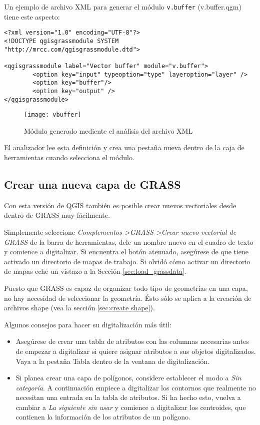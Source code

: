 Un ejemplo de archivo XML para generar el módulo \texttt{v.buffer} (v.buffer.qgm) tiene este aspecto:
\begin{verbatim}
<?xml version="1.0" encoding="UTF-8"?>
<!DOCTYPE qgisgrassmodule SYSTEM "http://mrcc.com/qgisgrassmodule.dtd">

<qgisgrassmodule label="Vector buffer" module="v.buffer">
        <option key="input" typeoption="type" layeroption="layer" />
        <option key="buffer"/>
        <option key="output" />
</qgisgrassmodule>
\end{verbatim}

\begin{figure}[ht]
\centering
\caption{Módulo generado mediente el análisis del archivo XML}\label{fig:buffer-module}
\texttt{[image: vbuffer]}
\end{figure}

El analizador lee esta definición y crea una pestaña nueva dentro de la caja de herramientas cuando selecciona el módulo.


\subsection{Crear una nueva capa de GRASS}\label{sec:creating_new_grass_vectors}

Con esta versión de QGIS también es posible crear nuevos vectoriales desde dentro de GRASS muy fácilmente.

Simplemente seleccione \textsl{Complementos->GRASS->Crear nuevo vectorial de GRASS} de la barra de herramientas, dele un nombre nuevo en el cuadro de texto y comience a digitalizar. Si encuentra el botón atenuado, asegúrese de que tiene activado un directorio de mapas de trabajo. Si olvidó cómo activar un directorio de mapas eche un vistazo a la Sección \ref{sec:load_grassdata}.

Puesto que GRASS es capaz de organizar todo tipo de geometrías en una capa, no hay necesidad de seleccionar la geometría. Ésto sólo se aplica a la creación de archivos shape (vea la sección \ref{sec:create shape}).

Algunos consejos para hacer su digitalización más útil:
\begin{itemize}
\item Asegúrese de crear una tabla de atributos con las columnas necesarias antes de empezar a digitalizar si quiere asignar atributos a sus objetos digitalizados. Vaya a la pestaña Tabla dentro de la ventana de digitalización.
\item Si planea crear una capa de polígonos, considere establecer el modo a \textsl{Sin categoría}. A continuación empiece a digitalizar los contornos que realmente no necesitan una entrada en la tabla de atributos. Si ha hecho esto, vuelva a cambiar a \textsl{La siguiente sin usar} y comience a digitalizar los centroides, que contienen la información de los atributos de un polígono.

\end{itemize}

